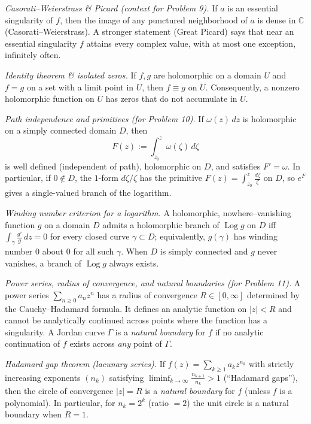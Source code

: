 \documentclass[11pt,a4paper]{article}
\theoremstyle{definition}
\theoremstyle{definition}
\theoremstyle{plain}
\theoremstyle{remark}
\DeclareMathOperator{\Log}{Log}
\begin{document}
\medskip
\emph{Casorati--Weierstrass \& Picard (context for Problem 9).}
If $a$ is an essential singularity of $f$, then the image of any punctured neighborhood of $a$ is dense in $\mathbb C$
(Casorati--Weierstrass). A stronger statement (Great Picard) says that near an essential singularity $f$ attains every complex value, with at most one exception, infinitely often.

\medskip
\emph{Identity theorem \& isolated zeros.}
If $f,g$ are holomorphic on a domain $U$ and $f=g$ on a set with a limit point in $U$, then $f\equiv g$ on $U$.
Consequently, a nonzero holomorphic function on $U$ has zeros that do not accumulate in $U$.

\medskip
\emph{Path independence and primitives (for Problem 10).}
If $\omega(z)\,dz$ is holomorphic on a simply connected domain $D$, then
\[
F(z):=\int_{z_0}^{z}\omega(\zeta)\,d\zeta
\]
is well defined (independent of path), holomorphic on $D$, and satisfies $F'=\omega$.
In particular, if $0\notin D$, the $1$-form $d\zeta/\zeta$ has the primitive
$F(z)=\int_{z_0}^z \frac{d\zeta}{\zeta}$ on $D$, so $e^{F}$ gives a single-valued branch of the logarithm.

\smallskip
\emph{Winding number criterion for a logarithm.}
A holomorphic, nowhere–vanishing function $g$ on a domain $D$ admits a holomorphic branch of $\Log g$ on $D$
iff $\displaystyle \int_{\gamma} \frac{g'}{g}\,dz=0$ for every closed curve $\gamma\subset D$;
equivalently, $g(\gamma)$ has winding number $0$ about $0$ for all such $\gamma$.
When $D$ is simply connected and $g$ never vanishes, a branch of $\Log g$ always exists.

\medskip
\emph{Power series, radius of convergence, and natural boundaries (for Problem 11).}
A power series $\sum_{n\ge0} a_n z^n$ has a radius of convergence $R\in[0,\infty]$ determined by the Cauchy--Hadamard formula.
It defines an analytic function on $|z|<R$ and cannot be analytically continued across points where the function has a singularity.
A Jordan curve $\Gamma$ is a \emph{natural boundary} for $f$ if no analytic continuation of $f$ exists across \emph{any} point of $\Gamma$.

\smallskip
\emph{Hadamard gap theorem (lacunary series).}
If $f(z)=\sum_{k\ge1} a_k z^{n_k}$ with strictly increasing exponents $(n_k)$ satisfying
$\displaystyle \liminf_{k\to\infty} \frac{n_{k+1}}{n_k}>1$ (``Hadamard gaps''),
then the circle of convergence $|z|=R$ is a \emph{natural boundary} for $f$ (unless $f$ is a polynomial).
In particular, for $n_k=2^k$ (ratio $=2$) the unit circle is a natural boundary when $R=1$.
\end{document}
